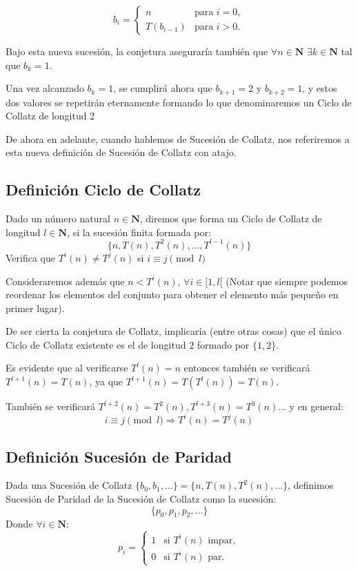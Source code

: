 \begin{equation}
\label{SucesionCollatzAtajada}
    b_i = \begin{cases}
    n & \text{para } i=0,\\
    T(b_{i-1}) & \text{para } i>0.
    \end{cases}
\end{equation}

Bajo esta nueva sucesión, la conjetura aseguraría también que $\forall n \in \mathbf{N}$ $\exists k \in \mathbf{N}$ tal que $b_k = 1$.

Una vez alcanzado $b_k=1$, se cumplirá ahora que $b_{k+1} = 2$ y $b_{k+2}=1$, y estos dos valores se repetirán eternamente formando lo que denominaremos un Ciclo de Collatz de longitud 2

De ahora en adelante, cuando hablemos de Sucesión de Collatz, nos referiremos a esta nueva definición de Sucesión de Collatz con atajo.


\subsection{Definición Ciclo de Collatz}
Dado un número natural $n\in  \mathbf{N}$, diremos que forma un Ciclo de Collatz de longitud $l\in\mathbf{N}$, si la sucesión finita formada por:
$$ \{ n, T(n), T^2(n), ..., T^{l-1}(n)\} $$
Verifica que $T^i(n) \neq T^j(n)$ si $i \equiv j \pmod l $

Consideraremos además que $n< T^i(n)$, $\forall i \in [1,l[$ (Notar que siempre podemos reordenar los elementos del conjunto para obtener el elemento más pequeño en primer lugar).

De ser cierta la conjetura de Collatz, implicaría (entre otras cosas) que el único Ciclo de Collatz existente es el de longitud $2$ formado por $\{ 1, 2 \}$.

Es evidente que al verificarse $T^l(n)=n$ entonces también se verificará $T^{l+1}(n) = T(n)$, ya que $T^{l+1}(n)=T(T^l(n))=T(n)$.

También se verificará $T^{l+2}(n)=T^2(n), T^{l+3}(n)=T^3(n)...$ y en general:
$$i \equiv j \pmod l \Longrightarrow T^i(n) = T^j(n)$$


\subsection{Definición Sucesión de Paridad}
Dada una Sucesión de Collatz  $\{b_0, b_1, ... \} = \{ n, T(n), T^2(n), ... \}$, definimos Sucesión de Paridad de la Sucesión de Collatz como la sucesión:
$$
    \{ p_0, p_1, p_2, ...\}
$$
Donde $\forall i \in \mathbf{N}$:
$$
    p_i = \begin{cases}
    1 & \text{si $T^i(n)$ impar},\\
    0 & \text{si $T^i(n)$ par}.
    \end{cases}
$$

